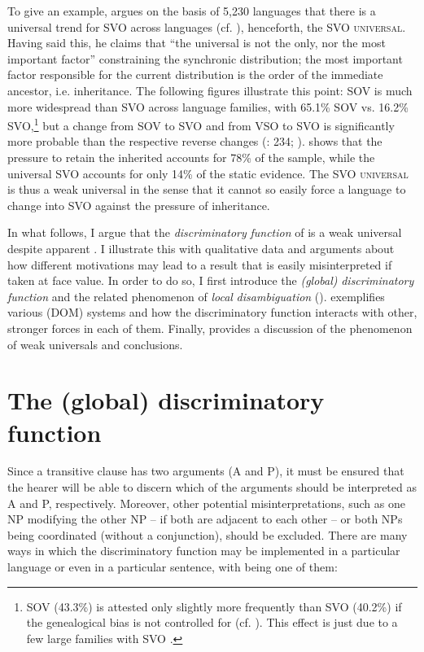 \documentclass[output=paper]{langsci/langscibook}
\begin{document}
To give an example, \citet{Hammarström2015} argues on the basis of 5,230 languages that there is a universal trend for SVO  across languages (cf. \citealt{Gell-MannRuhlen2011,MauritsGriffiths2014}), henceforth, the \textsc{SVO universal}. Having said this, he claims that “the universal is not the only, nor the most important factor” constraining the synchronic distribution; the most important factor responsible for the current distribution is the order of the immediate ancestor, i.e. inheritance. The following figures illustrate this point: SOV is much more widespread than SVO across language families, with 65.1\% SOV vs. 16.2\% SVO,\footnote{SOV (43.3\%) is attested only slightly more frequently than SVO (40.2\%) if the genealogical bias is not controlled for (cf. \citealt{Dryer2013_SOV}). This effect is just due to a few large families with SVO \citep{Hammarström2015}.} but a change from SOV to SVO and from VSO to SVO is significantly more probable than the respective reverse changes (\citealt{Croft2003}: 234; \citealt{MauritsGriffiths2014}). \citet{Hammarström2015} shows that the pressure to retain the inherited  accounts for 78\% of the sample, while the universal SVO accounts for only 14\% of the static evidence. The SVO \textsc{universal} is thus a weak universal in the sense that it cannot so easily force a language to change into SVO against the pressure of inheritance.

In what follows, I argue that the \textit{discriminatory} \textit{function} of  is a weak universal despite apparent . I illustrate this with qualitative data and arguments about how different motivations may lead to a result that is easily misinterpreted if taken at face value. In order to do so, I first introduce the \textit{(global)} \textit{discriminatory} \textit{function} and the related phenomenon of \textit{local} \textit{disambiguation} ().  exemplifies various  (DOM) systems and how the discriminatory function interacts with other, stronger forces in each of them. Finally,  provides a discussion of the phenomenon of weak universals and conclusions.

\section{The (global) discriminatory function}\label{sec:serzant:2}

Since a transitive clause has two arguments (A and P), it must be ensured that the hearer will be able to discern which of the arguments should be interpreted as A and P, respectively. Moreover, other potential misinterpretations, such as one NP modifying the other NP – if both are adjacent to each other – or both NPs being coordinated (without a conjunction), should be excluded. There are many ways in which the discriminatory function may be implemented in a particular language or even in a particular sentence, with  being one of them: 
\end{document}

